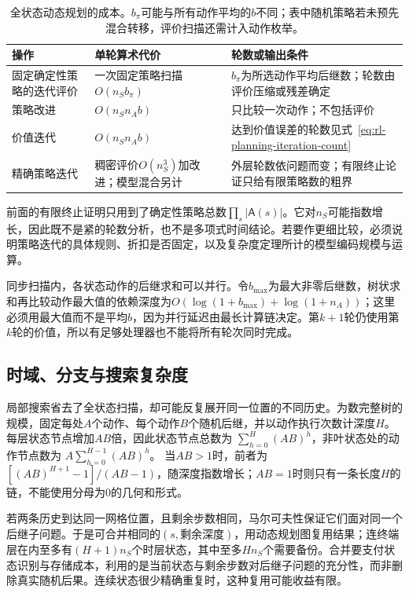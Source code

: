 \begin{table}[htbp]
 \centering
 \small
 \begin{tabularx}{\linewidth}{@{}l>{\raggedright\arraybackslash}X>{\raggedright\arraybackslash}X@{}}
  \toprule
  操作 & 单轮算术代价 & 轮数或输出条件\\
  \midrule
  固定确定性策略的迭代评价 & 一次固定策略扫描$O(n_Sb_\pi)$ & $b_\pi$为所选动作平均后继数；轮数由评价压缩或残差确定\\
  策略改进 & $O(n_Sn_Ab)$ & 只比较一次动作；不包括评价\\
  价值迭代 & $O(n_Sn_Ab)$ & 达到价值误差的轮数见式~\eqref{eq:rl-planning-iteration-count}\\
  精确策略迭代 & 稠密评价$O(n_S^3)$加改进；模型混合另计 & 外层轮数依问题而变；有限终止论证只给有限策略数的粗界\\
  \bottomrule
 \end{tabularx}
 \caption{全状态动态规划的成本。$b_\pi$可能与所有动作平均的$b$不同；表中随机策略若未预先混合转移，评价扫描还需计入动作枚举。}
 \label{tab:rl-planning-dp-costs}
\end{table}

前面的有限终止证明只用到了确定性策略总数$\prod_s|\mathsf A(s)|$。它对$n_S$可能指数增长，因此既不是紧的轮数分析，也不是多项式时间结论。若要作更细比较，必须说明策略迭代的具体规则、折扣是否固定，以及复杂度定理所计的模型编码规模与运算。

同步扫描内，各状态动作的后继求和可以并行。令$b_{\max}$为最大非零后继数，树状求和再比较动作最大值的依赖深度为$O(\log(1+b_{\max})+\log(1+n_A))$；这里必须用最大值而不是平均$b$，因为并行延迟由最长计算链决定。第$k+1$轮仍使用第$k$轮的价值，所以有足够处理器也不能将所有轮次同时完成。

\subsection{时域、分支与搜索复杂度}
\label{sec:rl-planning-search-complexity}

局部搜索省去了全状态扫描，却可能反复展开同一位置的不同历史。为数完整树的规模，固定每处$A$个动作、每个动作$B$个随机后继，并以动作执行次数计深度$H$。每层状态节点增加$AB$倍，因此状态节点总数为
$\sum_{h=0}^{H}(AB)^h$，非叶状态处的动作节点数为
$A\sum_{h=0}^{H-1}(AB)^h$。
当$AB>1$时，前者为$[(AB)^{H+1}-1]/(AB-1)$，随深度指数增长；$AB=1$时则只有一条长度$H$的链，不能使用分母为0的几何和形式。

若两条历史到达同一网格位置，且剩余步数相同，马尔可夫性保证它们面对同一个后继子问题。于是可合并相同的$(s,\text{剩余深度})$，用动态规划图复用结果；连终端层在内至多有$(H+1)n_S$个时层状态，其中至多$Hn_S$个需要备份。合并要支付状态识别与存储成本，利用的是当前状态与剩余步数对后继子问题的充分性，而非删除真实随机后果。连续状态很少精确重复时，这种复用可能收益有限。

